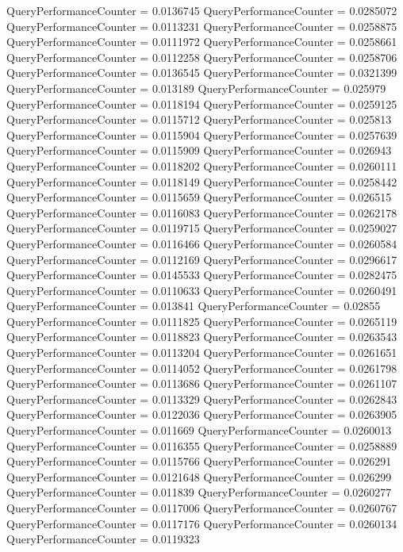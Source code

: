 \documentclass[9pt]{article}
\theoremstyle{plain}
\theoremstyle{definition}
\theoremstyle{remark}
\numberwithin{equation}{section}
\begin{document}
QueryPerformanceCounter  =  0.0136745
QueryPerformanceCounter  =  0.0285072
QueryPerformanceCounter  =  0.0113231
QueryPerformanceCounter  =  0.0258875
QueryPerformanceCounter  =  0.0111972
QueryPerformanceCounter  =  0.0258661
QueryPerformanceCounter  =  0.0112258
QueryPerformanceCounter  =  0.0258706
QueryPerformanceCounter  =  0.0136545
QueryPerformanceCounter  =  0.0321399
QueryPerformanceCounter  =  0.013189
QueryPerformanceCounter  =  0.025979
QueryPerformanceCounter  =  0.0118194
QueryPerformanceCounter  =  0.0259125
QueryPerformanceCounter  =  0.0115712
QueryPerformanceCounter  =  0.025813
QueryPerformanceCounter  =  0.0115904
QueryPerformanceCounter  =  0.0257639
QueryPerformanceCounter  =  0.0115909
QueryPerformanceCounter  =  0.026943
QueryPerformanceCounter  =  0.0118202
QueryPerformanceCounter  =  0.0260111
QueryPerformanceCounter  =  0.0118149
QueryPerformanceCounter  =  0.0258442
QueryPerformanceCounter  =  0.0115659
QueryPerformanceCounter  =  0.026515
QueryPerformanceCounter  =  0.0116083
QueryPerformanceCounter  =  0.0262178
QueryPerformanceCounter  =  0.0119715
QueryPerformanceCounter  =  0.0259027
QueryPerformanceCounter  =  0.0116466
QueryPerformanceCounter  =  0.0260584
QueryPerformanceCounter  =  0.0112169
QueryPerformanceCounter  =  0.0296617
QueryPerformanceCounter  =  0.0145533
QueryPerformanceCounter  =  0.0282475
QueryPerformanceCounter  =  0.0110633
QueryPerformanceCounter  =  0.0260491
QueryPerformanceCounter  =  0.013841
QueryPerformanceCounter  =  0.02855
QueryPerformanceCounter  =  0.0111825
QueryPerformanceCounter  =  0.0265119
QueryPerformanceCounter  =  0.0118823
QueryPerformanceCounter  =  0.0263543
QueryPerformanceCounter  =  0.0113204
QueryPerformanceCounter  =  0.0261651
QueryPerformanceCounter  =  0.0114052
QueryPerformanceCounter  =  0.0261798
QueryPerformanceCounter  =  0.0113686
QueryPerformanceCounter  =  0.0261107
QueryPerformanceCounter  =  0.0113329
QueryPerformanceCounter  =  0.0262843
QueryPerformanceCounter  =  0.0122036
QueryPerformanceCounter  =  0.0263905
QueryPerformanceCounter  =  0.011669
QueryPerformanceCounter  =  0.0260013
QueryPerformanceCounter  =  0.0116355
QueryPerformanceCounter  =  0.0258889
QueryPerformanceCounter  =  0.0115766
QueryPerformanceCounter  =  0.026291
QueryPerformanceCounter  =  0.0121648
QueryPerformanceCounter  =  0.026299
QueryPerformanceCounter  =  0.011839
QueryPerformanceCounter  =  0.0260277
QueryPerformanceCounter  =  0.0117006
QueryPerformanceCounter  =  0.0260767
QueryPerformanceCounter  =  0.0117176
QueryPerformanceCounter  =  0.0260134
QueryPerformanceCounter  =  0.0119323
\end{document}
